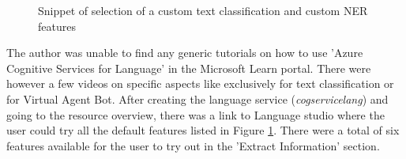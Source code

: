 \begin {figure}[h!h]
    \centering
    \caption{Snippet of selection of a custom text classification and custom \acs{NER} features}
    \label{createlangserv}
\end {figure}

The author was unable to find any generic tutorials on how to use 'Azure Cognitive Services for Language' in the Microsoft Learn portal. There were however a few videos on specific aspects like exclusively for text classification or for Virtual Agent Bot. After creating the language service (\textit{cogservicelang}) and going to the resource overview, there was a link to Language studio \cite{azlangstudio} where the user could try all the default features listed in Figure \ref{createlangserv}. There were a total of six features available for the user to try out in the 'Extract Information' section.

